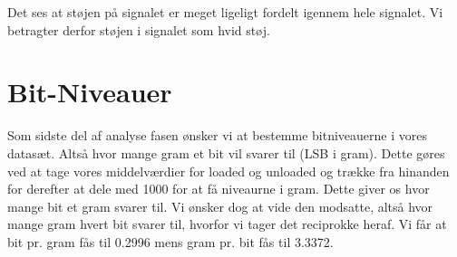 Det ses at støjen på signalet er meget ligeligt fordelt igennem hele signalet. Vi betragter derfor støjen i signalet som hvid støj. 

\section{Bit-Niveauer}
Som sidste del af analyse fasen ønsker vi at bestemme bitniveauerne i vores datasæt. Altså hvor mange gram et bit vil svarer til (LSB i gram). Dette gøres ved at tage vores middelværdier for loaded og unloaded og trække fra hinanden for derefter at dele med 1000 for at få niveaurne i gram. Dette giver os hvor mange bit et gram svarer til. Vi ønsker dog at vide den modsatte, altså hvor mange gram hvert bit svarer til, hvorfor vi tager det reciprokke heraf. Vi får at bit pr. gram fås til 0.2996 mens gram pr. bit fås til 3.3372. 


